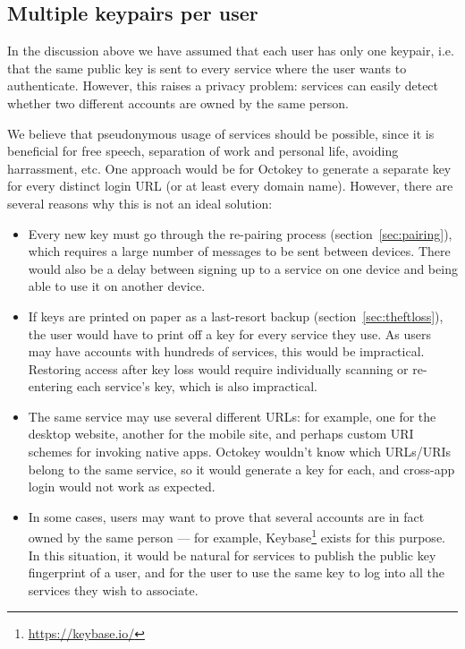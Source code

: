 \subsection{Multiple keypairs per user}\label{sec:identities}

In the discussion above we have assumed that each user has only one keypair, i.e. that the same
public key is sent to every service where the user wants to authenticate. However, this raises a
privacy problem: services can easily detect whether two different accounts are owned by the same
person.

We believe that pseudonymous usage of services should be possible, since it is beneficial for free
speech, separation of work and personal life, avoiding harrassment, etc. One approach would be for
Octokey to generate a separate key for every distinct login URL (or at least every domain name).
However, there are several reasons why this is not an ideal solution:
\begin{itemize}
\item Every new key must go through the re-pairing process (section~\ref{sec:pairing}), which
requires a large number of messages to be sent between devices. There would also be a delay between
signing up to a service on one device and being able to use it on another device.
\item If keys are printed on paper as a last-resort backup (section~\ref{sec:theftloss}), the user
would have to print off a key for every service they use. As users may have accounts with hundreds
of services, this would be impractical. Restoring access after key loss would require individually
scanning or re-entering each service's key, which is also impractical.
\item The same service may use several different URLs: for example, one for the desktop website,
another for the mobile site, and perhaps custom URI schemes for invoking native apps. Octokey
wouldn't know which URLs/URIs belong to the same service, so it would generate a key for each, and
cross-app login would not work as expected.
\item In some cases, users may want to prove that several accounts are in fact owned by the same
person --- for example, Keybase\footnote{\url{https://keybase.io/}} exists for this purpose. In this
situation, it would be natural for services to publish the public key fingerprint of a user, and for
the user to use the same key to log into all the services they wish to associate.
\end{itemize}

